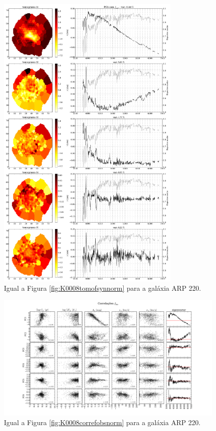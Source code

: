\begin{figure}
    \includegraphics[width=0.8\textwidth]{figuras/K0802-tomo-syn-norm.pdf}
    \caption[Tomogramas de 1 a 5 para o cubo $f_{obs}$ - ARP 220.]
    {Igual a Figura \ref{fig:K0008tomofsynnorm} para a galáxia ARP 220.}
    \label{fig:K0802tomofsynnorm}
\end{figure}

\begin{figure}
    \includegraphics[width=1.2\textwidth, angle=-90]{figuras/K0802-correl-f_obs_norm-PCvsPhys.pdf}
	\caption[Correlações PCs vs. par\^ametros f\'isicos - $f_{obs}$ - ARP 220.]
	{Igual a Figura \ref{fig:K0008correfobsnorm} para a galáxia ARP 220.}
    \label{fig:K0802correfobsnorm}
\end{figure}

